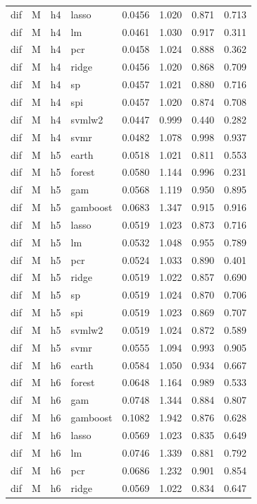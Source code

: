 \begin{ThreePartTable}
\begin{longtable}[t]{llclcccc}
dif & M & h4 & lasso & 0.0456 & 1.020 & 0.871 & 0.713\\
dif & M & h4 & lm & 0.0461 & 1.030 & 0.917 & 0.311\\
dif & M & h4 & pcr & 0.0458 & 1.024 & 0.888 & 0.362\\
dif & M & h4 & ridge & 0.0456 & 1.020 & 0.868 & 0.709\\
dif & M & h4 & sp & 0.0457 & 1.021 & 0.880 & 0.716\\
dif & M & h4 & spi & 0.0457 & 1.020 & 0.874 & 0.708\\
dif & M & h4 & svmlw2 & 0.0447 & 0.999 & 0.440 & 0.282\\
dif & M & h4 & svmr & 0.0482 & 1.078 & 0.998 & 0.937\\
\addlinespace
dif & M & h5 & earth & 0.0518 & 1.021 & 0.811 & 0.553\\
dif & M & h5 & forest & 0.0580 & 1.144 & 0.996 & 0.231\\
dif & M & h5 & gam & 0.0568 & 1.119 & 0.950 & 0.895\\
dif & M & h5 & gamboost & 0.0683 & 1.347 & 0.915 & 0.916\\
dif & M & h5 & lasso & 0.0519 & 1.023 & 0.873 & 0.716\\
dif & M & h5 & lm & 0.0532 & 1.048 & 0.955 & 0.789\\
dif & M & h5 & pcr & 0.0524 & 1.033 & 0.890 & 0.401\\
dif & M & h5 & ridge & 0.0519 & 1.022 & 0.857 & 0.690\\
dif & M & h5 & sp & 0.0519 & 1.024 & 0.870 & 0.706\\
dif & M & h5 & spi & 0.0519 & 1.023 & 0.869 & 0.707\\
dif & M & h5 & svmlw2 & 0.0519 & 1.024 & 0.872 & 0.589\\
dif & M & h5 & svmr & 0.0555 & 1.094 & 0.993 & 0.905\\
\addlinespace
dif & M & h6 & earth & 0.0584 & 1.050 & 0.934 & 0.667\\
dif & M & h6 & forest & 0.0648 & 1.164 & 0.989 & 0.533\\
dif & M & h6 & gam & 0.0748 & 1.344 & 0.884 & 0.807\\
dif & M & h6 & gamboost & 0.1082 & 1.942 & 0.876 & 0.628\\
dif & M & h6 & lasso & 0.0569 & 1.023 & 0.835 & 0.649\\
dif & M & h6 & lm & 0.0746 & 1.339 & 0.881 & 0.792\\
dif & M & h6 & pcr & 0.0686 & 1.232 & 0.901 & 0.854\\
dif & M & h6 & ridge & 0.0569 & 1.022 & 0.834 & 0.647\\

\end{longtable}
\end{ThreePartTable}
